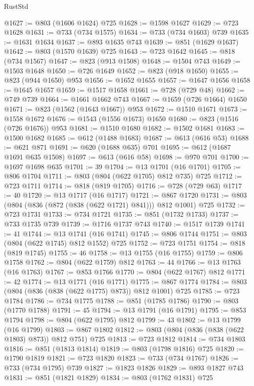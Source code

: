 \begin{lexlean}{RustStd}
\begin{coremodule}
@1627 := @803 (@1606 @1624) @725
@1628 := @1598 @1627
@1629 := @723 @1628
@1631 := @733 (@734 @1575)
@1634 := @733 (@734 @1603) @739
@1635 := @1631 @1634
@1637 := @893 @1635 @743
@1639 := @851 (@1629 @1637)
@1642 := @803 (@1570 @1639) @725
@1643 := @723 @1642
@1645 := @818 (@734 @1567)
@1647 := @823 (@913 @1508)
@1648 := @1504 @743
@1649 := @1503 @1648
@1650 := @726 @1649
@1652 := @823 (@918 @1650)
@1655 := @823 (@944 @1650) @953
@1656 := @1652 @1655
@1657 := @1647 @1656
@1658 := @1645 @1657
@1659 := @1517 @1658
@1661 := @728 (@729 @48)
@1662 := @749 @739
@1664 := @1661 @1662 @743
@1667 := @1659 (@726 @1664) @1650
@1671 := @823 (@1562 (@1643 @1667)) @953
@1672 := @1510 @1671
@1673 := @1558 @1672
@1676 := @1543 (@1556 @1673) @1650
@1680 := @823 (@1516 (@726 @1676)) @953
@1681 := @1510 @1680
@1682 := @1502 @1681
@1683 := @1500 @1682
@1685 := @612 (@1488 @1683)
@1687 := @613 (@616 @53)
@1688 := @621 @871
@1691 := @620 (@1688 @635) @701
@1695 := @612 (@1687 @1691 @635 @1508)
@1697 := @613 (@616 @58)
@1698 := @970 @701
@1700 := @1697 @1698 @635
@1701 := 39
@1704 := @13 @1701 (@16 @1701)
@1705 := @806 @1704
@1711 := @803 (@804 (@622 @1705) @812 @735) @725
@1712 := @723 @1711
@1714 := @818 (@819 @1705)
@1716 := @728 (@729 @63)
@1717 := 40
@1720 := @13 @1717 (@16 @1717)
@1721 := @867 @1720
@1731 := @803 (@804 (@836 (@872 (@838 (@622 @1721) @841))) @812 @1001) @725
@1732 := @723 @1731
@1733 := @734 @1721
@1735 := @851 (@1732 @1733)
@1737 := @733 @1735 @739
@1739 := @1716 @1737 @743
@1740 := @1517 @1739
@1741 := 41
@1744 := @13 @1741 (@16 @1741)
@1745 := @806 @1744
@1751 := @803 (@804 (@622 @1745) @812 @1552) @725
@1752 := @723 @1751
@1754 := @818 (@819 @1745)
@1755 := 46
@1758 := @13 @1755 (@16 @1755)
@1759 := @806 @1758
@1762 := @804 (@622 @1759) @812
@1763 := 44
@1766 := @13 @1763 (@16 @1763)
@1767 := @853 @1766
@1770 := @804 (@622 @1767) @812
@1771 := 42
@1774 := @13 @1771 (@16 @1771)
@1775 := @867 @1774
@1784 := @803 (@804 (@836 (@838 (@622 @1775) @873)) @812 @1001) @725
@1785 := @723 @1784
@1786 := @734 @1775
@1788 := @851 (@1785 @1786)
@1790 := @803 (@1770 @1788)
@1791 := 45
@1794 := @13 @1791 (@16 @1791)
@1795 := @853 @1794
@1798 := @804 (@622 @1795) @812
@1799 := 43
@1802 := @13 @1799 (@16 @1799)
@1803 := @867 @1802
@1812 := @803 (@804 (@836 (@838 (@622 @1803) @873)) @812 @751) @725
@1813 := @723 @1812
@1814 := @734 @1803
@1816 := @851 (@1813 @1814)
@1819 := @803 (@1798 @1816) @725
@1820 := @1790 @1819
@1821 := @723 @1820
@1823 := @733 (@734 @1767)
@1826 := @733 (@734 @1795) @739
@1827 := @1823 @1826
@1829 := @893 @1827 @743
@1831 := @851 (@1821 @1829)
@1834 := @803 (@1762 @1831) @725

\end{coremodule}
\end{lexlean}
